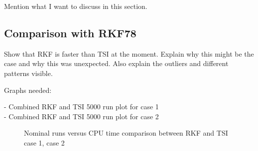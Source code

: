 Mention what I want to discuss in this section.

\subsection{Comparison with \ac{RKF78}}
\label{subsec:timeCompRKF}
Show that RKF is faster than TSI at the moment. Explain why this might be the case and why this was unexpected. Also explain the outliers and different patterns visible. 

Graphs needed:

- Combined RKF and TSI 5000 run plot for case 1 \\
- Combined RKF and TSI 5000 run plot for case 2 \\

\begin{figure}
\centering
{} 
\caption{Nominal runs versus CPU time comparison between \ac{RKF} and \ac{TSI} \protect{} case 1,  \protect{} case 2 } 
\label{fig:multiRunVsCPUcase1RKFTSIsmall} 
\end{figure} 

